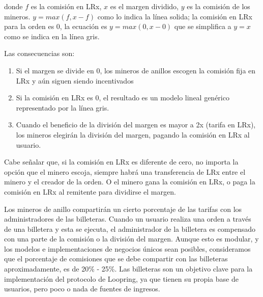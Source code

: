 \documentclass[UTF8,nofonts]{article}
\begin{document}
\begin{multicols}{2}
donde $f$ es la comisi\'on en LRx, $x$ es el margen dividido, $y$ es la comisi\'on de los mineros. $y=max(f, x-f)$ como lo indica la l\'inea solida; la comisi\'on en LRx para la orden es $0$, la ecuaci\'on es  $y=max(0, x - 0)$ que se simplifica a $y=x$ como se indica en la l\'inea gris.

Las consecuencias son:
\begin{enumerate}
	\item Si el margen se divide en 0, los mineros de anillos escogen la comisi\'on fija en LRx y a\'un siguen siendo incentivados 
	\item Si la comisi\'on en LRx es 0, el resultado es un modelo lineal gen\'erico representado por la l\'inea gris.
	\item Cuando el beneficio de la divisi\'on del margen es mayor a 2x (tarifa en LRx), los mineros elegir\'an la divisi\'on del margen, pagando la comisi\'on en LRx al usuario.
\end{enumerate}
Cabe se\~nalar que, si la comisi\'on en LRx es diferente de cero, no importa la opci\'on que el minero escoja, siempre habr\'a una transferencia de LRx entre el minero y el creador de la orden. O el minero gana la comisi\'on en LRx, o paga la comisi\'on en LRx al remitente para dividirse el margen.

Los mineros de anillo compartir\'an un cierto porcentaje de las tarifas con los administradores de las billeteras. Cuando un usuario realiza una orden a trav\'es de una billetera y esta se ejecuta, el administrador de la billetera es compensado con una parte de la comisi\'on o la divisi\'on del margen. Aunque esto es modular, y los modelos e implementaciones de negocios \'unicos sean posibles, consideramos que el porcentaje de comisiones que se debe compartir con las billeteras aproximadamente, es de 20\% - 25\%. Las billeteras son un objetivo clave para la implementaci\'on del protocolo de Loopring, ya que tienen su propia base de usuarios, pero poco o nada de fuentes de ingresos.


\end{multicols}
\end{document}
